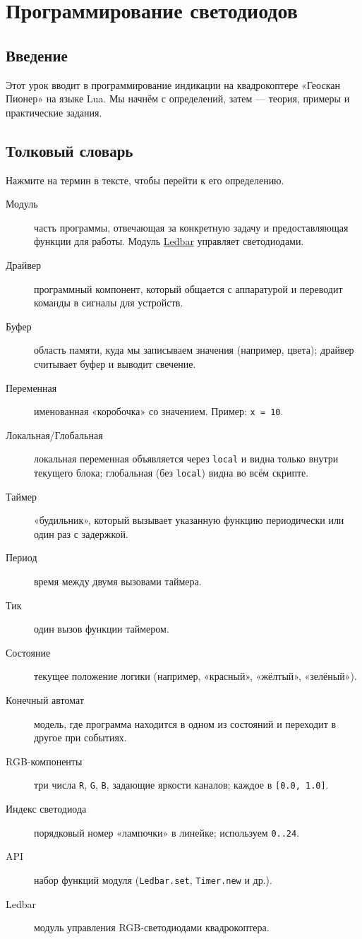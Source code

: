 \section{Программирование светодиодов}
\subsection{Введение}
Этот урок вводит в программирование индикации на квадрокоптере «Геоскан Пионер» на языке Lua. Мы начнём с определений, затем — теория, примеры и практические задания.

\subsection{Толковый словарь}
Нажмите на термин в тексте, чтобы перейти к его определению.
\begin{description}
  \item[\hypertarget{term:module}{Модуль}] часть программы, отвечающая за конкретную задачу и предоставляющая функции для работы. Модуль \hyperlink{term:ledbar}{Ledbar} управляет светодиодами.
  \item[\hypertarget{term:driver}{Драйвер}] программный компонент, который общается с аппаратурой и переводит команды в сигналы для устройств.
  \item[\hypertarget{term:buffer}{Буфер}] область памяти, куда мы записываем значения (например, цвета); драйвер считывает буфер и выводит свечение.
  \item[\hypertarget{term:variable}{Переменная}] именованная «коробочка» со значением. Пример: \verb|x = 10|.
  \item[\hypertarget{term:scope}{Локальная/Глобальная}] локальная переменная объявляется через \verb|local| и видна только внутри текущего блока; глобальная (без \verb|local|) видна во всём скрипте.
  \item[\hypertarget{term:timer}{Таймер}] «будильник», который вызывает указанную функцию периодически или один раз с задержкой.
  \item[\hypertarget{term:period}{Период}] время между двумя вызовами таймера.
  \item[\hypertarget{term:tick}{Тик}] один вызов функции таймером.
  \item[\hypertarget{term:state}{Состояние}] текущее положение логики (например, «красный», «жёлтый», «зелёный»).
  \item[\hypertarget{term:automaton}{Конечный автомат}] модель, где программа находится в одном из состояний и переходит в другое при событиях.
  \item[\hypertarget{term:rgb}{RGB-компоненты}] три числа \verb|R|, \verb|G|, \verb|B|, задающие яркости каналов; каждое в \verb|[0.0, 1.0]|.
  \item[\hypertarget{term:index}{Индекс светодиода}] порядковый номер «лампочки» в линейке; используем \verb|0..24|.
  \item[\hypertarget{term:api}{API}] набор функций модуля (\verb|Ledbar.set|, \verb|Timer.new| и др.).
  \item[\hypertarget{term:ledbar}{Ledbar}] модуль управления RGB-светодиодами квадрокоптера.
\end{description}

